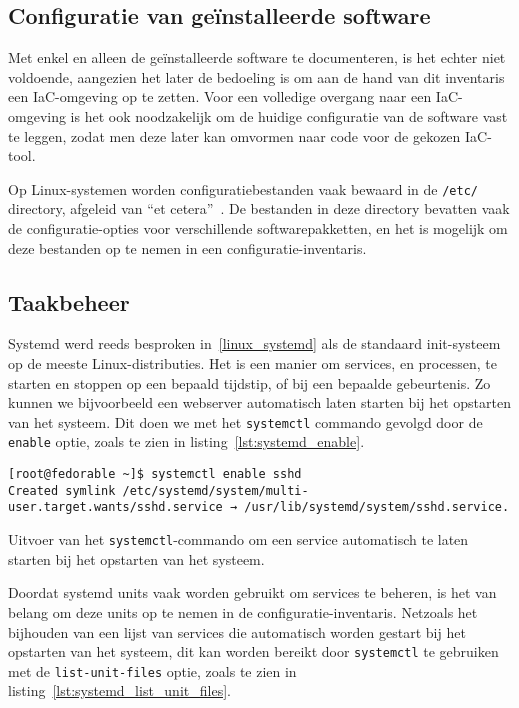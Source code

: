 \subsection{Configuratie van ge{\"i}nstalleerde software}
\label{risico_software_configuratie}

Met enkel en alleen de ge\"installeerde software te documenteren, is het echter niet voldoende, aangezien het later de bedoeling is om aan de hand van dit inventaris een IaC-omgeving op te zetten.
Voor een volledige overgang naar een IaC-omgeving is het ook noodzakelijk om de huidige configuratie van de software vast te leggen, zodat men deze later kan omvormen naar code voor de gekozen IaC-tool.

Op Linux-systemen worden configuratiebestanden vaak bewaard in de \texttt{/etc/} directory, afgeleid van ``et cetera''~\autocite{linuxfoundation-filesystem}.
De bestanden in deze directory bevatten vaak de configuratie-opties voor verschillende softwarepakketten, en het is mogelijk om deze bestanden op te nemen in een configuratie-inventaris.

\subsection{Taakbeheer}
\label{risico_taakbeheer}

Systemd werd reeds besproken in~\ref{linux_systemd} als de standaard init-systeem op de meeste Linux-distributies.
Het is een manier om services, en processen, te starten en stoppen op een bepaald tijdstip, of bij een bepaalde gebeurtenis.
Zo kunnen we bijvoorbeeld een webserver automatisch laten starten bij het opstarten van het systeem.
Dit doen we met het \texttt{systemctl} commando gevolgd door de \texttt{enable} optie, zoals te zien in listing~\ref{lst:systemd_enable}.

\begin{listing}
  \begin{verbatim}
[root@fedorable ~]$ systemctl enable sshd
Created symlink /etc/systemd/system/multi-user.target.wants/sshd.service → /usr/lib/systemd/system/sshd.service.
  \end{verbatim}
  \caption{Uitvoer van het \texttt{systemctl}-commando om een service automatisch te laten starten bij het opstarten van het systeem.}
  \label{lst:systemd_enable}
\end{listing}

Doordat systemd units vaak worden gebruikt om services te beheren, is het van belang om deze units op te nemen in de configuratie-inventaris.
Netzoals het bijhouden van een lijst van services die automatisch worden gestart bij het opstarten van het systeem, dit kan worden bereikt door \texttt{systemctl} te gebruiken met de \texttt{list-unit-files} optie, zoals te zien in listing~\ref{lst:systemd_list_unit_files}.

